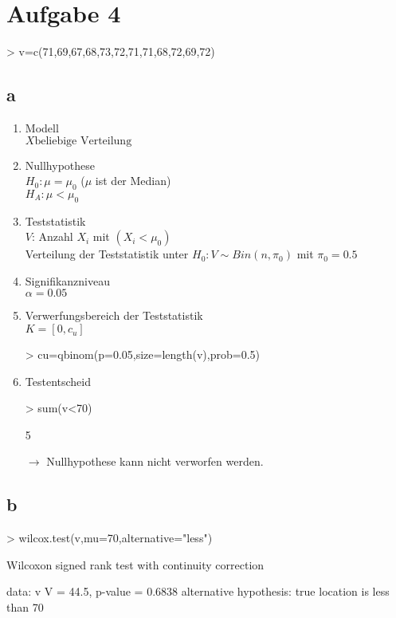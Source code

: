

\section{Aufgabe 4}
\begin{Schunk}
\begin{Sinput}
> v=c(71,69,67,68,73,72,71,71,68,72,69,72)
\end{Sinput}
\end{Schunk}

\subsection{a}
\begin{enumerate}
  \item Modell \\
        $ X \text{beliebige Verteilung} $
  \item Nullhypothese \\
        $ H_0: \mu = \mu_0 $ ($\mu$ ist der Median) \\
        $ H_A: \mu < \mu_0 $
  \item Teststatistik \\
        $V$: Anzahl $X_i$ mit $(X_i < \mu_0)$ \\
        Verteilung der Teststatistik unter $ H_0: V \sim Bin(n,\pi_0) $ 
        mit $ \pi_0 = 0.5 $
  \item Signifikanzniveau \\
        $ \alpha = 0.05 $
  \item Verwerfungsbereich der Teststatistik \\
        $ K = [0, c_u] $
\begin{Schunk}
\begin{Sinput}
>         cu=qbinom(p=0.05,size=length(v),prob=0.5)
\end{Sinput}
\end{Schunk}
  \item Testentscheid \\
\begin{Schunk}
\begin{Sinput}
>         sum(v<70)
\end{Sinput}
\begin{Soutput}
[1] 5
\end{Soutput}
\end{Schunk}
        $\rightarrow$ Nullhypothese kann nicht verworfen werden. 
\end{enumerate}

\subsection{b}
\begin{Schunk}
\begin{Sinput}
> wilcox.test(v,mu=70,alternative="less")
\end{Sinput}
\begin{Soutput}
	Wilcoxon signed rank test with continuity correction

data:  v 
V = 44.5, p-value = 0.6838
alternative hypothesis: true location is less than 70 
\end{Soutput}
\end{Schunk}

